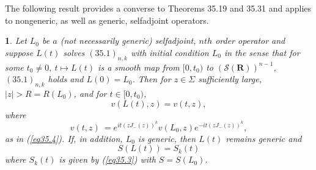 \documentclass{surv-l}
\theoremstyle{plain}
\newtheorem{lemma}[theorem]{\sc{Lemma}}
\theoremstyle{definition}
\numberwithin{equation}{chapter}
\begin{document}
The following result provides a converse to Theorems 35.19 and 35.31 and applies to nongeneric, as well as generic, selfadjoint operators.
\setcounter{theorem}{32}
\begin{lemma}\label{lem35.33}
Let $L_{0}$ be $a$ \emph{(}not necessarily generic\emph{)} selfadjoint, $nth$ order operator and suppose $L(t)$ solves $(35.1)_{n,k}$ with initial condition $L_{0}$ in the sense that for some $t_{0}\neq 0,\ t\mapsto L(t)$ is a smooth map from $[0, t_{0})$ to $(\mathscr{S}(\mathbf{R}))^{n-1}$, $(35.1)_{n,k}$ holds and $L(0)=L_{0}$. Then for $ z\in\Sigma$ sufficiently large, $|z|>R= R(L_{0})$, and for $t\in[0, t_{0})$,
\setcounter{equation}{33}
\begin{equation}\label{eq35.34}
v(L(t), z)=v(t, z),
\end{equation}
where
\begin{equation*}
v(t, z)\ =e^{it(zJ_{-}(z))^{k}}v(L_{0}, z)e^{-it(zJ_{-}(z))^{k}},
\end{equation*}
as in \emph{(\ref{eq35.4})}. If, in addition, $L_{0}$ is generic, then $L(t)$ remains generic and
\begin{equation}\label{eq35.35}
S(L(t))=S_{k}(t)
\end{equation}
where $S_{k}(t)$ is given by \emph{(\ref{eq35.3})} with $S=S(L_{0})$.
\end{lemma}
\end{document}
